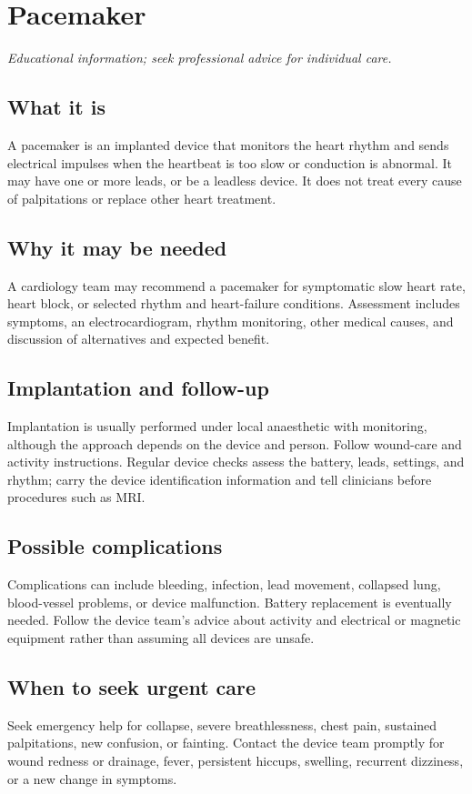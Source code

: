 \chapter{Pacemaker}

\medskip
\noindent\textit{Educational information; seek professional advice for individual care.}

\section*{What it is}
A pacemaker is an implanted device that monitors the heart rhythm and sends electrical impulses when the heartbeat is too slow or conduction is abnormal. It may have one or more leads, or be a leadless device. It does not treat every cause of palpitations or replace other heart treatment.

\section*{Why it may be needed}
A cardiology team may recommend a pacemaker for symptomatic slow heart rate, heart block, or selected rhythm and heart-failure conditions. Assessment includes symptoms, an electrocardiogram, rhythm monitoring, other medical causes, and discussion of alternatives and expected benefit.

\section*{Implantation and follow-up}
Implantation is usually performed under local anaesthetic with monitoring, although the approach depends on the device and person. Follow wound-care and activity instructions. Regular device checks assess the battery, leads, settings, and rhythm; carry the device identification information and tell clinicians before procedures such as MRI.

\section*{Possible complications}
Complications can include bleeding, infection, lead movement, collapsed lung, blood-vessel problems, or device malfunction. Battery replacement is eventually needed. Follow the device team’s advice about activity and electrical or magnetic equipment rather than assuming all devices are unsafe.

\section*{When to seek urgent care}
Seek emergency help for collapse, severe breathlessness, chest pain, sustained palpitations, new confusion, or fainting. Contact the device team promptly for wound redness or drainage, fever, persistent hiccups, swelling, recurrent dizziness, or a new change in symptoms.

